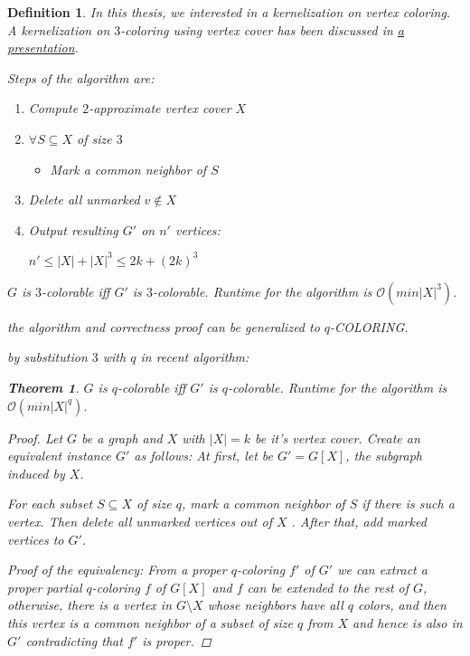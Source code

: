 \documentclass[12pt]{article}
\theoremstyle{slplain}
\newtheorem{theorem}{Theorem}
\newtheorem{defi}{Definition}
\begin{document}
\begin{defi}
In this thesis, we interested in a kernelization on vertex coloring. 
A kernelization on $3$-coloring using vertex cover has been discussed in \href{https://onedrive.live.com/view.aspx?resid=D39E73028C0B20E6!2586&ithint=file%2cpptx&app=PowerPoint&authkey=!AFs8zyWC8bfQ0PA}{a presentation}\cite{bart}.

Steps of the algorithm are:

\begin{enumerate}
\item Compute $2$-approximate vertex cover $X$

\item $\forall S\subseteq X$ of size $3$
\begin{itemize}
\item Mark a common neighbor of $S$
\end{itemize}
\item Delete all unmarked $v \not\in X$

\item Output resulting $G'$ on $n'$ vertices:

\begin{center}
$n' \leq |X| + |X|^3 \leq 2k + (2k)^3$
\end{center}
\end{enumerate}

$G$ is $3$-colorable iff $G'$ is $3$-colorable. Runtime for the algorithm is $\mathcal{O}(min|X|^3)$.

the algorithm and correctness proof can be generalized to $q$-COLORING. \cite{kra}


by substitution $3$ with $q$ in recent algorithm:

\begin{theorem}{\label{main theorem}}
$G$ is $q$-colorable iff $G'$ is $q$-colorable. Runtime for the algorithm
is $\mathcal{O}(min|X|^q)$.
\end{theorem}

\begin{proof}
Let $G$ be a graph and $X$ with $|X| = k$ be it's vertex cover. Create an
equivalent instance $G'$ as follows: At first, let be $G' = G[X]$,  the subgraph induced by $X$. 

For each subset
$S \subseteq X$ of size $q$, mark a common neighbor of $S$ if there is such a vertex.
Then delete all unmarked vertices out of $X$ . After that, add marked vertices to $G'$. 

Proof of the equivalency: From a proper $q$-coloring $f'$ of $G'$ we
can extract a proper partial $q$-coloring $f$ of $G[X]$ and $f$ can be extended to the rest of $G$, otherwise, there is a vertex in $G \setminus X$ whose neighbors have all $q$ colors, and then this vertex is a common neighbor of a subset of size $q$ from
$X$ and hence is also in $G'$ contradicting that $f'$ is proper.


\end{proof}
\end{defi}
\end{document}
